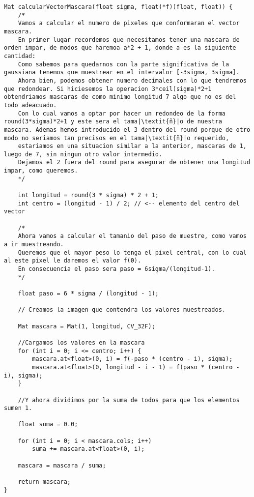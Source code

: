 \documentclass[10pt,a4paper]{article}
\begin{document}
\begin{lstlisting}
Mat calcularVectorMascara(float sigma, float(*f)(float, float)) {
	/*
	Vamos a calcular el numero de pixeles que conformaran el vector mascara.
	En primer lugar recordemos que necesitamos tener una mascara de orden impar, de modos que haremoa a*2 + 1, donde a es la siguiente cantidad:
	Como sabemos para quedarnos con la parte significativa de la gaussiana tenemos que muestrear en el intervalor [-3sigma, 3sigma].
	Ahora bien, podemos obtener numero decimales con lo que tendremos que redondear. Si hiciesemos la operacion 3*ceil(sigma)*2+1 obtendriamos mascaras de como minimo longitud 7 algo que no es del todo adeacuado.
	Con lo cual vamos a optar por hacer un redondeo de la forma round(3*sigma)*2+1 y este sera el tama|\textit{ñ}|o de nuestra mascara. Ademas hemos introducido el 3 dentro del round porque de otro modo no seriamos tan precisos en el tama|\textit{ñ}|o requerido,
	estariamos en una situacion similar a la anterior, mascaras de 1, luego de 7, sin ningun otro valor intermedio.
	Dejamos el 2 fuera del round para asegurar de obtener una longitud impar, como queremos.
	*/

	int longitud = round(3 * sigma) * 2 + 1;
	int centro = (longitud - 1) / 2; // <-- elemento del centro del vector

	/*
	Ahora vamos a calcular el tamanio del paso de muestre, como vamos a ir muestreando.
	Queremos que el mayor peso lo tenga el pixel central, con lo cual al este pixel le daremos el valor f(0).
	En consecuencia el paso sera paso = 6sigma/(longitud-1).
	*/

	float paso = 6 * sigma / (longitud - 1);

	// Creamos la imagen que contendra los valores muestreados.

	Mat mascara = Mat(1, longitud, CV_32F);

	//Cargamos los valores en la mascara
	for (int i = 0; i <= centro; i++) {
		mascara.at<float>(0, i) = f(-paso * (centro - i), sigma);
		mascara.at<float>(0, longitud - i - 1) = f(paso * (centro - i), sigma);
	}

	//Y ahora dividimos por la suma de todos para que los elementos sumen 1.

	float suma = 0.0;

	for (int i = 0; i < mascara.cols; i++)
		suma += mascara.at<float>(0, i);

	mascara = mascara / suma;

	return mascara;
}
\end{lstlisting}
\end{document}
